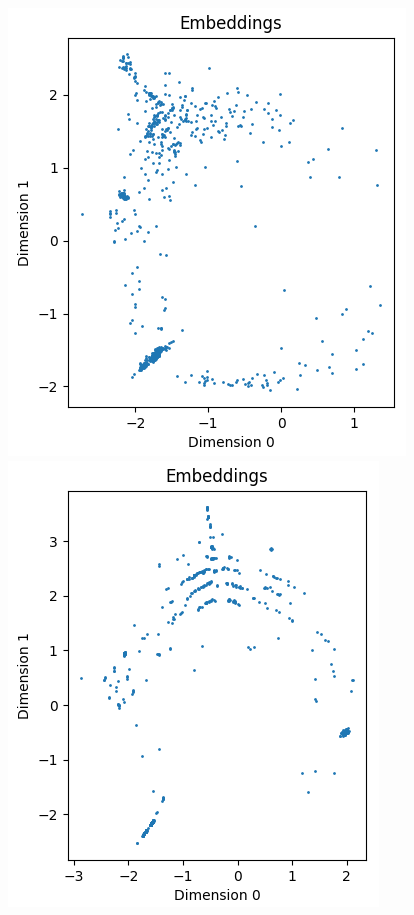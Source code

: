 \documentclass{article}
\begin{document}
\begin{figure}[H]
  \centering
  \begin{minipage}{0.35\textwidth}
    \centering
    \includegraphics[width=\linewidth]{figures/short_term.png}
  \end{minipage}%
  \begin{minipage}{0.35\textwidth}
    \centering
    \includegraphics[width=\linewidth]{figures/long_term.png}

\end{minipage}
\end{figure}
\end{document}
